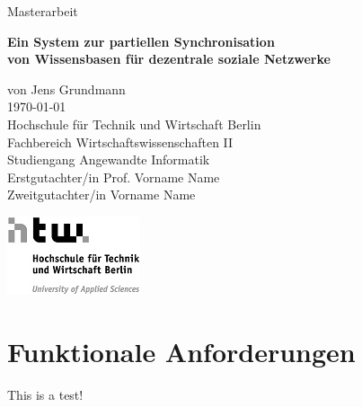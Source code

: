 \documentclass[a4paper]{article}
\begin{document}
	\begin{titlepage}
		
		\begin{flushright}	
			{\large Masterarbeit \\}
			\begin{Large}
				\textbf{
					Ein System zur partiellen Synchronisation \\ 
					von Wissensbasen für dezentrale soziale Netzwerke \\
				} 
			\end{Large}
			\vspace{1.0cm}
			\begin{large}	
				von Jens Grundmann \\
				\today \\
				\vspace{1.0cm}
				Hochschule für Technik und Wirtschaft Berlin \\
				Fachbereich Wirtschaftswissenschaften II \\
				Studiengang Angewandte Informatik \\
				\vspace{1.0cm}
				Erstgutachter/in Prof. Vorname Name \\
				Zweitgutachter/in Vorname Name \\	
				\vspace{0.5cm}
				\begin{center}
					\includegraphics{../Bilder/htw_logo.jpg}
				\end{center}				
			\end{large}
		\end{flushright}	

	\end{titlepage}
\ClearWallPaper

\tableofcontents
\newpage

	\section{Funktionale Anforderungen}
	
	This is a test!
\end{document}
